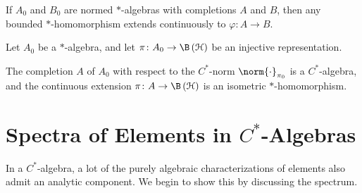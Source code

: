 \begin{lemma}
  If $A_0$ and $B_0$ are normed $\ast$-algebras with completions $A$ and $B$, then any bounded $\ast$-homomorphism extends continuously to $\varphi\colon A\rightarrow B$.
\end{lemma}
\begin{corollary}
  Let $A_0$ be a $\ast$-algebra, and let $\pi\colon A_0\rightarrow \B\left( \mathcal{H} \right)$ be an injective representation.\newline

  The completion $A$ of $A_0$ with respect to the $C^{\ast}$-norm $\norm{\cdot}_{\pi_0}$ is a $C^{\ast}$-algebra, and the continuous extension $\pi\colon A\rightarrow \B\left( \mathcal{H} \right)$ is an isometric $\ast$-homomorphism.
\end{corollary}
\section{Spectra of Elements in \texorpdfstring{$C^{\ast}$-Algebras}{C*-Algebras}}%
In a $C^{\ast}$-algebra, a lot of the purely algebraic characterizations of elements also admit an analytic component. We begin to show this by discussing the spectrum.\newline

